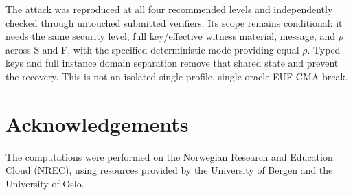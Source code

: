 \documentclass[11pt,a4paper]{article}
\begin{document}
The attack was reproduced at all four recommended levels and independently
checked through untouched submitted verifiers.  Its scope remains conditional:
it needs the same security level, full key/effective witness material, message,
and $\rho$ across S and F, with the specified deterministic mode providing equal
$\rho$.  Typed keys and full instance domain separation remove that shared state
and prevent the recovery.  This is not an isolated single-profile,
single-oracle EUF-CMA break.

\section*{Acknowledgements}

The computations were performed on the Norwegian Research and Education Cloud
(NREC), using resources provided by the University of Bergen and the University
of Oslo.
\end{document}
